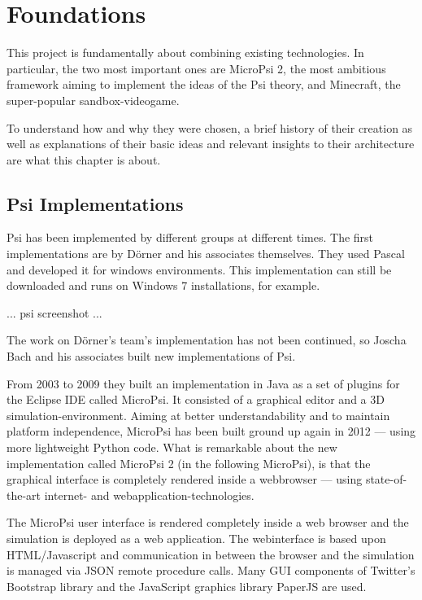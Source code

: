 \chapter{Foundations}
This project is fundamentally about combining existing technologies. In particular, the two most important ones are MicroPsi 2, the most ambitious framework aiming to implement the ideas of the Psi theory, and Minecraft, the super-popular sandbox-videogame.

To understand how and why they were chosen, a brief history of their creation as well as explanations of their basic ideas and relevant insights to their architecture are what this chapter is about.

    \section{Psi Implementations}
Psi has been implemented by different groups at different times. The first implementations are by Dörner and his associates themselves. They used Pascal and developed it for windows environments. This implementation can still be downloaded and runs on Windows 7 installations, for example.

... psi screenshot ... %

The work on Dörner's team's implementation has not been continued, so Joscha Bach and his associates built new implementations of Psi.

From 2003 to 2009 they built an implementation in Java as a set of plugins for the Eclipse IDE called MicroPsi. It consisted of a graphical editor and a 3D simulation-environment. Aiming at better understandability and to maintain platform independence, MicroPsi has been built ground up again in 2012 --- using more lightweight Python code. What is remarkable about the new implementation called MicroPsi 2 (in the following MicroPsi), is that the graphical interface is completely rendered inside a webbrowser --- using state-of-the-art internet- and webapplication-technologies.~\cite{conf/agi/Bach12}

The MicroPsi user interface is rendered completely inside a web browser and the simulation is deployed as a web application. The webinterface is based upon HTML/Javascript and communication in between the browser and the simulation is managed via JSON remote procedure calls. Many GUI components of Twitter's Bootstrap library and the JavaScript graphics library PaperJS are used.~\cite{conf/agi/Bach12}

